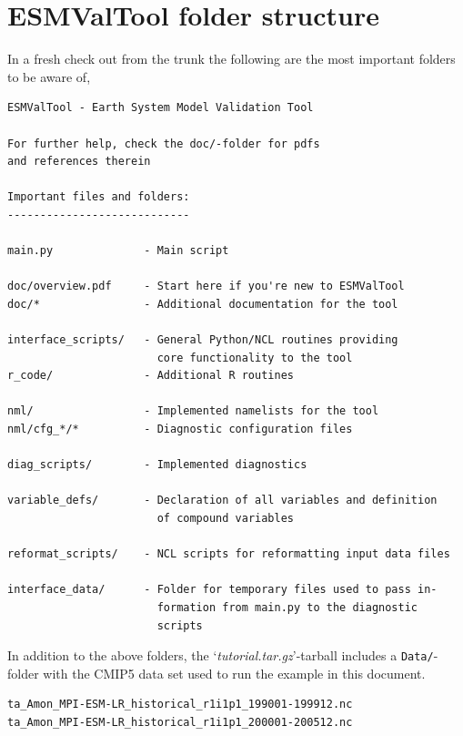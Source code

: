 \documentclass[12pt]{article}
\newcommand{\docref}[1]{`\emph{#1}'}
\begin{document}


% 
% 
\section{ESMValTool folder structure}\label{section:overall_structure}
In a fresh check out from the trunk\cite{ESMValTool_repo} the
following are the most important folders to be aware of,
\begin{Verbatim}[frame=single, fontsize=\footnotesize]
ESMValTool - Earth System Model Validation Tool

For further help, check the doc/-folder for pdfs
and references therein

Important files and folders:
----------------------------

main.py              - Main script

doc/overview.pdf     - Start here if you're new to ESMValTool
doc/*                - Additional documentation for the tool

interface_scripts/   - General Python/NCL routines providing
                       core functionality to the tool
r_code/              - Additional R routines

nml/                 - Implemented namelists for the tool
nml/cfg_*/*          - Diagnostic configuration files

diag_scripts/        - Implemented diagnostics

variable_defs/       - Declaration of all variables and definition 
                       of compound variables

reformat_scripts/    - NCL scripts for reformatting input data files

interface_data/      - Folder for temporary files used to pass in-
                       formation from main.py to the diagnostic
                       scripts
\end{Verbatim}
In addition to the above folders, the
\docref{tutorial.tar.gz}-tarball\cite{tutorial-tarball} includes a
\texttt{Data/}-folder with the CMIP5 data set used to run the example in
this document.

\begin{Verbatim}[frame=single, fontsize=\footnotesize]
ta_Amon_MPI-ESM-LR_historical_r1i1p1_199001-199912.nc
ta_Amon_MPI-ESM-LR_historical_r1i1p1_200001-200512.nc
\end{Verbatim}
\end{document}
